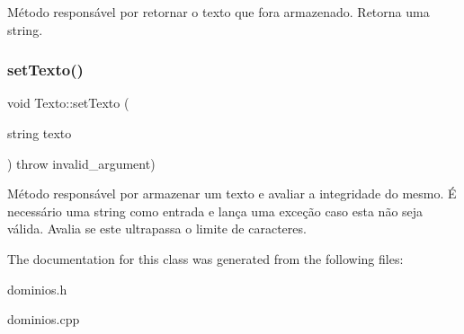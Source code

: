 Método responsável por retornar o texto que fora armazenado. Retorna uma string. \mbox{\label{classTexto_a2757e0409bd76bb77c8eb6ecb09cc69d}} 
\subsubsection{\texorpdfstring{set\+Texto()}{setTexto()}}
{\footnotesize\ttfamily void Texto\+::set\+Texto (\begin{DoxyParamCaption}\item[{string}]{texto }\end{DoxyParamCaption}) throw  invalid\+\_\+argument) }

Método responsável por armazenar um texto e avaliar a integridade do mesmo. É necessário uma string como entrada e lança uma exceção caso esta não seja válida. Avalia se este ultrapassa o limite de caracteres. 

The documentation for this class was generated from the following files\+:\begin{DoxyCompactItemize}
\item 
dominios.\+h\item 
dominios.\+cpp\end{DoxyCompactItemize}
